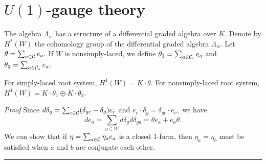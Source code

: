 \section{$U(1)$-gauge theory}
The algebra $\Lambda_w$ has a structure of a differential graded 
algebra over $K.$ Denote by $H^*(W)$ the cohomology group of the differential 
graded algebra $\Lambda_w.$ 
Let $\theta=\sum_{a\in {\cal C}}e_a.$ If $W$ is nonsimply-laced, 
we define $\theta_1=\sum_{a\in {\cal C}_l}e_a$ and 
$\theta_2=\sum_{a\in {\cal C}_s}e_a.$ 
\begin{prop}
For simply-laced root system, 
$H^1(W)= K\cdot \theta.$ For nonsimply-laced root system, 
$H^1(W)= K\cdot \theta_1 \oplus K\cdot \theta_2.$ 
\end{prop}
{\it Proof} \quad Since $d\delta_g = \sum_{c\in {\cal C}} 
(\delta_{gc} - \delta_g)e_c$ and $e_c \cdot \delta_g = \delta_{gc} 
\cdot e_c,$ we have 
\[ de_a = \sum_{g\in W} d\delta_g d\delta_{ga} = \theta e_a + e_a 
\theta. \] 
We can show that if $\eta =\sum_{a\in {\cal C}} \eta_a e_a$ 
is a closed 1-form, then $\eta_a = \eta_b$ must be satisfied 
when $a$ and $b$ are conjugate each other. \quad \rule{3mm}{3mm} 

